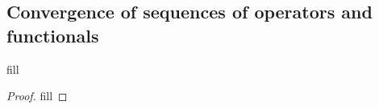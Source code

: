 \subsection{Convergence of sequences of operators and functionals}

\begin{exercise}{1}
fill
\end{exercise}
\begin{proof}
fill
\end{proof}